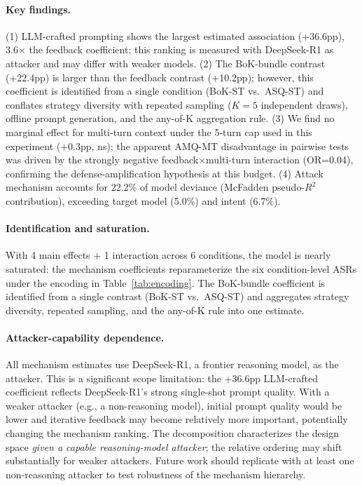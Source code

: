 \documentclass[11pt]{article}
\begin{document}
\paragraph{Key findings.} (1) LLM-crafted prompting shows the largest estimated association (+36.6pp), 3.6$\times$ the feedback coefficient; this ranking is measured with DeepSeek-R1 as attacker and may differ with weaker models. (2) The BoK-bundle contrast (+22.4pp) is larger than the feedback contrast (+10.2pp); however, this coefficient is identified from a single condition (BoK-ST vs.\ ASQ-ST) and conflates strategy diversity with repeated sampling ($K{=}5$ independent draws), offline prompt generation, and the any-of-K aggregation rule. (3) We find no marginal effect for multi-turn context under the 5-turn cap used in this experiment (+0.3pp, ns); the apparent AMQ-MT disadvantage in pairwise tests was driven by the strongly negative feedback$\times$multi-turn interaction (OR=0.04), confirming the defense-amplification hypothesis at this budget. (4) Attack mechanism accounts for 22.2\% of model deviance (McFadden pseudo-$R^2$ contribution), exceeding target model (5.0\%) and intent (6.7\%).

\paragraph{Identification and saturation.} With 4 main effects + 1 interaction across 6 conditions, the model is nearly saturated: the mechanism coefficients reparameterize the six condition-level ASRs under the encoding in Table~\ref{tab:encoding}. The BoK-bundle coefficient is identified from a single contrast (BoK-ST vs.\ ASQ-ST) and aggregates strategy diversity, repeated sampling, and the any-of-K rule into one estimate.

\paragraph{Attacker-capability dependence.} All mechanism estimates use DeepSeek-R1, a frontier reasoning model, as the attacker. This is a significant scope limitation: the +36.6pp LLM-crafted coefficient reflects DeepSeek-R1's strong single-shot prompt quality. With a weaker attacker (e.g., a non-reasoning model), initial prompt quality would be lower and iterative feedback may become relatively more important, potentially changing the mechanism ranking. The decomposition characterizes the design space \textit{given a capable reasoning-model attacker}; the relative ordering may shift substantially for weaker attackers. Future work should replicate with at least one non-reasoning attacker to test robustness of the mechanism hierarchy.
\end{document}
